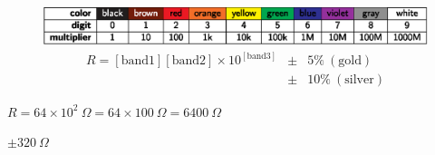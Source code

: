 \documentclass[11pt]{article}
\def\lthtmlcheckvsize{\ifdim\ht\sizebox<\vsize 
  \ifdim\wd\sizebox<\hsize\expandafter\hfill\fi \expandafter\vfill
  \else\expandafter\vss\fi}%
\begin{document}
{\newpage\clearpage
{}%
\begin{figure}  
  \begin{center}
    
  \end{center}
\end{figure}%
\lthtmlfigureZ
\lthtmlcheckvsize\clearpage}

{\newpage\clearpage
{}%
\begin{figure}  
  \begin{center}
    \includegraphics{resistor_color_codes.eps}
    \begin{eqnarray*}
      R = [\mathrm{band 1}][\mathrm{band 2}] 
      \times 10^{[\mathrm{band 3}]} & \pm & 5\%~(\mathrm{gold})\\
      & \pm & 10\%~(\mathrm{silver})\nonumber
    \end{eqnarray*}
    
  \end{center}
\end{figure}%
\lthtmlfigureZ
\lthtmlcheckvsize\clearpage}

{\newpage\clearpage
{}%
$R = 64
\times 10^{2}~\Omega = 64 \times 100~\Omega = 6400~\Omega$%
\lthtmlindisplaymathZ
\lthtmlcheckvsize\clearpage}

{\newpage\clearpage
{}%
$\pm 320~\Omega$%
\lthtmlindisplaymathZ
\lthtmlcheckvsize\clearpage}
\end{document}
